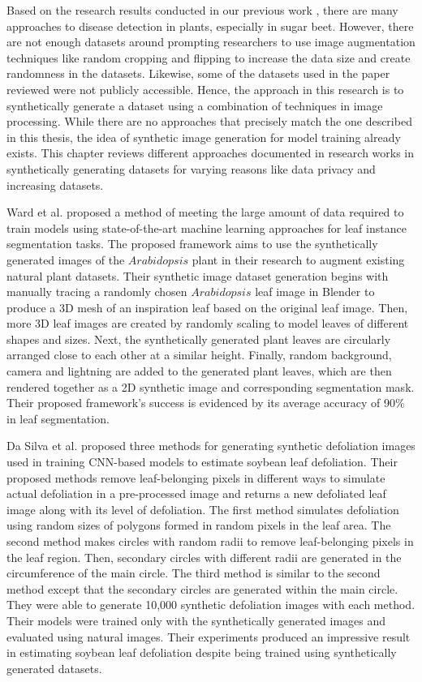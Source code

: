 Based on the research results conducted in our previous work \cite{project_work}, there are many approaches to disease detection in plants, especially in sugar beet. However, there are not enough datasets around prompting researchers to use image augmentation techniques like random cropping and flipping to increase the data size and create randomness in the datasets. Likewise, some of the datasets used in the paper reviewed were not publicly accessible. Hence, the approach in this research is to synthetically generate a dataset using a combination of techniques in image processing. While there are no approaches that precisely match the one described in this thesis, the idea of synthetic image generation for model training already exists.
This chapter reviews different approaches documented in research works in synthetically generating datasets for varying reasons like data privacy and increasing datasets.


Ward et al. \cite{ward2018deep}proposed a method of meeting the large amount of data required to train models using state-of-the-art machine learning approaches for leaf instance segmentation tasks. The proposed framework aims to use the synthetically generated images of the $Arabidopsis$ plant in their research to augment existing natural plant datasets. Their synthetic image dataset generation begins with manually tracing a randomly chosen $Arabidopsis$ leaf image in Blender to produce a 3D mesh of an inspiration leaf based on the original leaf image. Then, more 3D leaf images are created by randomly scaling to model leaves of different shapes and sizes. Next, the synthetically generated plant leaves are circularly arranged close to each other at a similar height. Finally, random background, camera and lightning are added to the generated plant leaves, which are then rendered together as a 2D synthetic image and corresponding segmentation mask. Their proposed framework's success is evidenced by its average accuracy of 90\% in leaf segmentation.

Da Silva et al. \cite{da2019estimating} proposed three methods for generating synthetic defoliation images used in training CNN-based models to estimate soybean leaf defoliation. Their proposed methods remove leaf-belonging pixels in different ways to simulate actual defoliation in a pre-processed image and returns a new defoliated leaf image along with its level of defoliation. 
The first method simulates defoliation using random sizes of polygons formed in random pixels in the leaf area. The second method makes circles with random radii to remove leaf-belonging pixels in the leaf region. Then, secondary circles with different radii are generated in the circumference of the main circle. The third method is similar to the second method except that the secondary circles are generated within the main circle. They were able to generate 10,000 synthetic defoliation images with each method. Their models were trained only with the synthetically generated images and evaluated using natural images. Their experiments produced an impressive result in estimating soybean leaf defoliation despite being trained using synthetically generated datasets.




